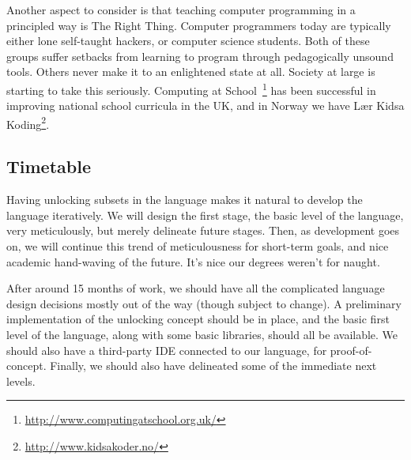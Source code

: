Another aspect to consider is that teaching computer programming in a 
principled way is The Right Thing. Computer programmers today are typically 
either lone self-taught hackers, or computer science students. Both of these 
groups suffer setbacks from learning to program through pedagogically unsound 
tools. Others never make it to an enlightened state at all. Society at large 
is starting to take this seriously. Computing at 
School~\footnote{\url{http://www.computingatschool.org.uk/}} has been 
successful in improving national school curricula in the UK, and in Norway we 
have Lær Kidsa Koding\footnote{\url{http://www.kidsakoder.no/}}.

\subsection{Timetable}
Having unlocking subsets in the language makes it natural to develop the 
language iteratively. We will design the first stage, the basic level of the 
language, very meticulously, but merely delineate future stages. Then, as 
development goes on, we will continue this trend of meticulousness for 
short-term goals, and nice academic hand-waving of the future. It's nice our 
degrees weren't for naught.

After around 15 months of work, we should have all the complicated language 
design decisions mostly out of the way (though subject to change). A 
preliminary implementation of the unlocking concept should be in place, and 
the basic first level of the language, along with some basic libraries, should 
all be available. We should also have a third-party IDE connected to our 
language, for proof-of-concept. Finally, we should also have delineated some 
of the immediate next levels.
